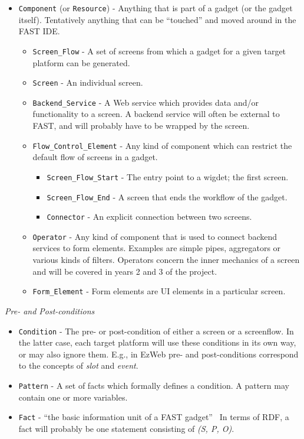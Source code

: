 \documentclass{fast_latex}
\begin{document}
\begin{itemize}
	\item \texttt{Component} (or \texttt{Resource}) - Anything that is part of a gadget (or the gadget itself). Tentatively anything that can be ``touched'' and moved around in the FAST IDE.
	\begin{itemize}
		\item \texttt{Screen\_Flow} - A set of screens from which a gadget for a given target platform can be generated.
		\item \texttt{Screen} - An individual screen.
		\item \texttt{Backend\_Service} - A Web service which provides data and/or functionality to a screen. A backend service will often be external to FAST, and will probably have to be wrapped by the screen.
		\item \texttt{Flow\_Control\_Element} - Any kind of component which can restrict the default flow of screens in a gadget.
		\begin{itemize}
			\item \texttt{Screen\_Flow\_Start} - The entry point to a wigdet; the first screen.
			\item \texttt{Screen\_Flow\_End} - A screen that ends the workflow of the gadget.
			\item \texttt{Connector} - An explicit connection between two screens.
		\end{itemize}
		\item \texttt{Operator} - Any kind of component that is used to connect backend services to form elements. Examples are simple pipes, aggregators or various kinds of filters. Operators concern the inner mechanics of a screen and will be covered in years 2 and 3 of the project.
		\item \texttt{Form\_Element} - Form elements are UI elements in a particular screen.
	\end{itemize}
\end{itemize}

\emph{Pre- and Post-conditions}

\begin{itemize}
	\item \texttt{Condition} - The pre- or post-condition of either a screen or a screenflow. In the latter case, each target platform will use these conditions in its own way, or may also ignore them. E.g., in EzWeb pre- and post-conditions correspond to the concepts of \emph{slot} and \emph{event}.
	\item \texttt{Pattern} - A set of facts which formally defines a condition. A pattern may contain one or more variables.
	\item \texttt{Fact} - ``the basic information unit of a FAST gadget''~\cite{solero2009fast_architecture} In terms of RDF, a fact will probably be one statement consisting of \emph{(S, P, O)}.
\end{itemize}
\end{document}
